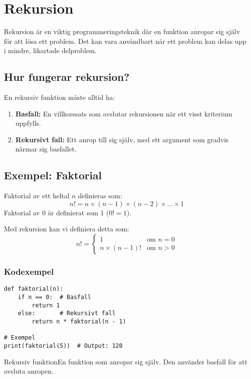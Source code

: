 \section{Rekursion}
\label{section:recursion}
Rekursion är en viktig programmeringsteknik där en funktion anropar sig själv för att lösa ett problem. Det kan vara användbart när ett problem kan delas upp i mindre, likartade delproblem.

\subsection{Hur fungerar rekursion?}
En rekursiv funktion måste alltid ha:
\begin{enumerate}
    \item \textbf{Basfall:} En villkorssats som avslutar rekursionen när ett visst kriterium uppfylls.
    \item \textbf{Rekursivt fall:} Ett anrop till sig själv, med ett argument som gradvis närmar sig basfallet.
\end{enumerate}

\subsection{Exempel: Faktorial}
Faktorial av ett heltal \( n \) definieras som:
\[
n! = n \times (n-1) \times (n-2) \times \dots \times 1
\]
Faktorial av 0 är definierat som 1 (\( 0! = 1 \)).

Med rekursion kan vi definiera detta som:
\[
n! = 
\begin{cases} 
1 & \text{om } n = 0 \\
n \times (n-1)! & \text{om } n > 0
\end{cases}
\]

\subsubsection*{Kodexempel}
\begin{lstlisting}[title=Rekursiv faktorialfunktion]
def faktorial(n):
    if n == 0:  # Basfall
        return 1
    else:       # Rekursivt fall
        return n * faktorial(n - 1)

# Exempel
print(faktorial(5))  # Output: 120
\end{lstlisting}

\begin{rconceptbox}{Rekursiv funktion}{En funktion som anropar sig själv. Den använder basfall för att avsluta anropen.}
\end{rconceptbox}

